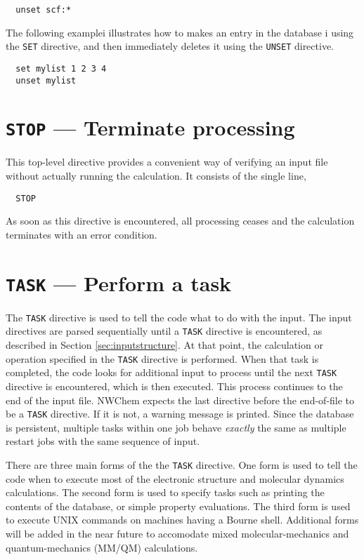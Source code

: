 \begin{verbatim}
  unset scf:*
\end{verbatim}

The following examplei illustrates how to makes an entry in the database i
using the \verb+SET+ directive, 
and then immediately deletes it using the \verb+UNSET+ directive.

\begin{verbatim}
  set mylist 1 2 3 4
  unset mylist
\end{verbatim}



\section{{\tt STOP} --- Terminate processing}

This top-level directive provides a convenient way of verifying 
an input file without actually running the calculation.  It consists 
of the single line,

\begin{verbatim}
  STOP
\end{verbatim}

As soon as this directive is encountered, all processing ceases and
the calculation terminates with an error condition.

\section{{\tt TASK} --- Perform a task}
\label{sec:task}

The \verb+TASK+ directive is used to tell the code what to do with the
input.  The input directives are parsed sequentially until a
\verb+TASK+ directive is encountered, as described in Section
\ref{sec:inputstructure}.  At that point, the calculation or operation
specified in the \verb+TASK+ directive is performed.  When that task
is completed, the code looks for additional input to process until the
next \verb+TASK+ directive is encountered, which is then executed.
This process continues to the end of the input file.  NWChem expects
the last directive before the end-of-file to be a \verb+TASK+
directive.  If it is not, a warning message is printed.  Since the
database is persistent, multiple tasks within one job behave {\em
  exactly} the same as multiple restart jobs with the same sequence of
input.

There are three main forms of the the \verb+TASK+ directive.  One form is
used to tell the code when to execute most of the electronic structure 
and molecular dynamics
calculations.  The second form is used to specify tasks such as
printing the contents of the database, or simple property
evaluations.  The third form is used to execute UNIX commands on machines
having a Bourne shell.  Additional forms will be added in the near
future to accomodate mixed molecular-mechanics and quantum-mechanics
(MM/QM) calculations.

